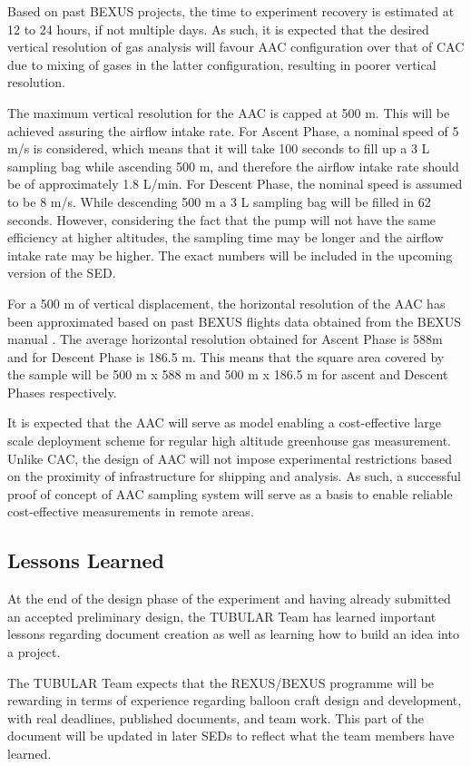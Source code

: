 \documentclass[a4paper,12pt,twoside]{article}
\begin{document}
Based on past BEXUS projects, the time to experiment recovery is estimated at 12 to 24 hours, if not multiple days. As such, it is expected that the desired vertical resolution of gas analysis will favour AAC configuration over that of CAC due to mixing of gases in the latter configuration, resulting in poorer vertical resolution.

The maximum vertical resolution for the AAC is capped at 500 m. This will be achieved assuring the airflow intake rate. For Ascent Phase, a nominal speed of 5 m/s is considered, which means that it will take 100 seconds to fill up a 3 L sampling bag while ascending 500 m, and therefore the airflow intake rate should be of approximately 1.8 L/min. For Descent Phase, the nominal speed is assumed to be 8 m/s. While descending 500 m a 3 L sampling bag will be filled in 62 seconds. However, considering the fact that the pump will not have the same efficiency at higher altitudes, the sampling time may be longer and the airflow intake rate may be higher. The exact numbers will be included in the upcoming version of the SED.  

For a 500 m of vertical displacement, the horizontal resolution of the AAC has been approximated based on past BEXUS flights data obtained from the BEXUS manual \cite{BexusManual}. The average horizontal resolution obtained for Ascent Phase is 588m and for Descent Phase is 186.5 m. This means that the square area covered by the sample will be 500 m x 588 m and 500 m x 186.5 m for ascent and Descent Phases respectively.

It is expected that the AAC will serve as model enabling a cost-effective large scale deployment scheme for regular high altitude greenhouse gas measurement. Unlike CAC, the design of AAC will not impose experimental restrictions based on the proximity of infrastructure for shipping and analysis. As such, a successful proof of concept of AAC sampling system will serve as a basis to enable reliable cost-effective measurements in remote areas.


 
\pagebreak
\subsection{Lessons Learned}
At the end of the design phase of the experiment and having already submitted an accepted preliminary design, the TUBULAR Team has learned important lessons regarding document creation as well as learning how to build an idea into a project. \par
The TUBULAR Team expects that the REXUS/BEXUS programme will be rewarding in terms of experience regarding balloon craft design and development, with real deadlines, published documents, and team work. This part of the document will be updated in later SEDs to reflect what the team members have learned.
\end{document}
